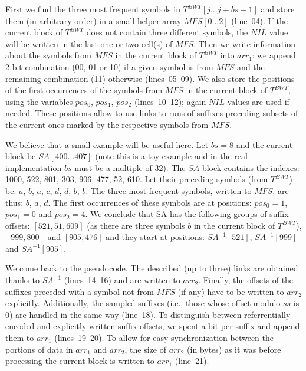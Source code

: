 \documentclass{cai}
\begin{document}
First we find the three most frequent symbols in $T^{BWT}[j \ldots j+bs-1]$ and store them 
(in arbitrary order) in a small helper array $MFS[0 \ldots 2]$ (line~04).
If the current block of $T^{BWT}$ does not contain three different symbols, 
the $NIL$ value will be written in the last one or two cell(s) of $MFS$.
Then we write information about the symbols from $MFS$ in the current block of $T^{BWT}$
into $arr_1$: we append 2-bit combination (00, 01 or 10) if a given symbol is from $MFS$ 
and the remaining combination (11) otherwise (lines~05--09).
We also store the positions of the first occurrences of the symbols from $MFS$ 
in the current block of $T^{BWT}$, using the variables $pos_0$, $pos_1$, $pos_2$ 
(lines~10--12); 
again $NIL$ values are used if needed.
These positions allow to use links to runs of suffixes 
preceding subsets of the current ones marked by the respective symbols from $MFS$.

We believe that a small example will be useful here.
Let $bs = 8$ and the current block be $SA[400 \ldots 407]$ (note this is a toy example 
and in the real implementation $bs$ must be a multiple of 32).
The $SA$ block contains the indexes: 1000, 522, 801, 303, 906, 477, 52, 610.
Let their preceding symbols (from $T^{BWT}$) be: $a$, $b$, $a$, $c$, $d$, $d$, $b$, $b$.
The three most frequent symbols, written to $MFS$, are thus: $b$, $a$, $d$.
The first occurrences of these symbols are at positions: 
$pos_0 = 1$, $pos_1 = 0$ and $pos_2 = 4$. 
We conclude that SA has the following groups of suffix offsets: 
$[521, 51, 609]$ (as there are three symbols $b$ in the current block of $T^{BWT}$), 
$[999, 800]$ and $[905, 476]$ and they start at positions: 
$SA^{-1}[521]$, $SA^{-1}[999]$ and $SA^{-1}[905]$.


We come back to the pseudocode.
The described (up to three) links are obtained thanks to 
$SA^{-1}$ (lines~14--16) and are written to $arr_2$.
Finally, the offsets of the suffixes preceded with a symbol not from $MFS$ 
(if any) have to be written to $arr_2$ explicitly.
Additionally, the sampled suffixes (i.e., those whose offset modulo $ss$ is 0) 
are handled in the same way (line~18).
To distinguish between referrentially encoded and explicitly written 
suffix offsets, we spent a bit per suffix and append them to $arr_1$ 
(lines~19--20).
To allow for easy synchronization between the portions of data in $arr_1$ 
and $arr_2$, the size of $arr_2$ (in bytes) as it was before processing the 
current block is written to $arr_1$ (line~21).
\end{document}
